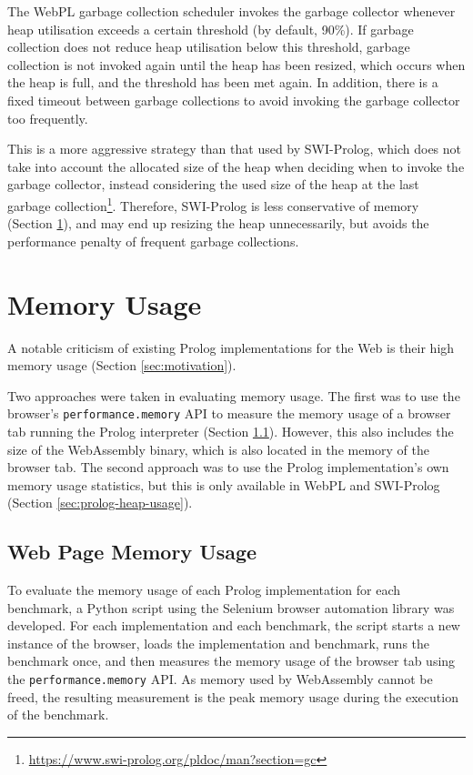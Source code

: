 The WebPL garbage collection scheduler invokes the garbage collector whenever heap utilisation exceeds a certain threshold (by default, 90\%). If garbage collection does not reduce heap utilisation below this threshold, garbage collection is not invoked again until the heap has been resized, which occurs when the heap is full, and the threshold has been met again. In addition, there is a fixed timeout between garbage collections to avoid invoking the garbage collector too frequently.

This is a more aggressive strategy than that used by SWI-Prolog, which does not take into account the allocated size of the heap when deciding when to invoke the garbage collector, instead considering the used size of the heap at the last garbage collection\footnote{\url{https://www.swi-prolog.org/pldoc/man?section=gc}}. Therefore, SWI-Prolog is less conservative of memory (Section \ref{sec:memory-usage}), and may end up resizing the heap unnecessarily, but avoids the performance penalty of frequent garbage collections.

\section{Memory Usage}

\label{sec:memory-usage}

A notable criticism of existing Prolog implementations for the Web is their high memory usage (Section \ref{sec:motivation}).

Two approaches were taken in evaluating memory usage. The first was to use the browser's \texttt{performance.memory} API to measure the memory usage of a browser tab running the Prolog interpreter (Section \ref{sec:web-page-memory-usage}). However, this also includes the size of the WebAssembly binary, which is also located in the memory of the browser tab. The second approach was to use the Prolog implementation's own memory usage statistics, but this is only available in WebPL and SWI-Prolog (Section \ref{sec:prolog-heap-usage}).

\subsection{Web Page Memory Usage}

\label{sec:web-page-memory-usage}

To evaluate the memory usage of each Prolog implementation for each benchmark, a Python script using the Selenium browser automation library was developed. For each implementation and each benchmark, the script starts a new instance of the browser, loads the implementation and benchmark, runs the benchmark once, and then measures the memory usage of the browser tab using the \texttt{performance.memory} API. As memory used by WebAssembly cannot be freed, the resulting measurement is the peak memory usage during the execution of the benchmark.

